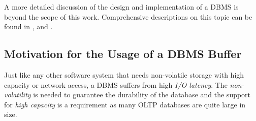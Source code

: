 	A more detailed discussion of the design and implementation of a DBMS is beyond the scope of this work. Comprehensive descriptions on this topic can be found in \cite{Database_Systems_-_The_Complete_Book}, \cite{Datenbanksysteme_-_Konzepte_und_Techniken_der_Implementierung} and \cite{Datenbanken_-_Implementierungstechniken}.

\subsection[Motivation for a DBMS Buffer]{Motivation for the Usage of a DBMS Buffer} \label{subsec:motivationbuffer}

	Just like any other software system that needs non-volatile storage with high capacity or network access, a DBMS suffers from high \emph{I/O latency}. The \emph{non-volatility} is needed to guarantee the durability of the database and the support for \emph{high capacity} is a requirement as many OLTP databases are quite large in size. 
	
